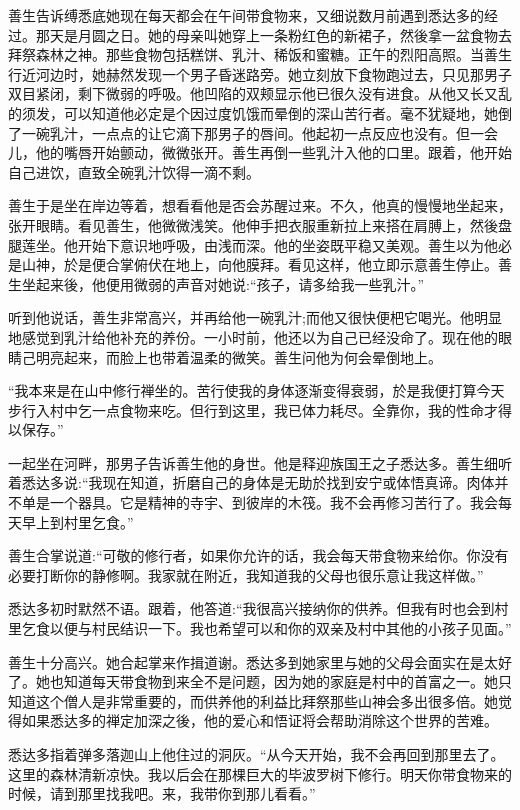 \documentclass[12pt,twoside,openany]{book}
\begin{document}
善生告诉缚悉底她现在每天都会在午间带食物来，又细说数月前遇到悉达多的经过。那天是月圆之日。她的母亲叫她穿上一条粉红色的新裙子，然後拿一盆食物去拜祭森林之神。那些食物包括糕饼、乳汁、稀饭和蜜糖。正午的烈阳高照。当善生行近河边时，她赫然发现一个男子昏迷路旁。她立刻放下食物跑过去，只见那男子双目紧闭，剩下微弱的呼吸。他凹陷的双颊显示他已很久没有进食。从他又长又乱的须发，可以知道他必定是个因过度饥饿而晕倒的深山苦行者。毫不犹疑地，她倒了一碗乳汁，一点点的让它滴下那男子的唇间。他起初一点反应也没有。但一会儿，他的嘴唇开始颤动，微微张开。善生再倒一些乳汁入他的口里。跟着，他开始自己进饮，直致全碗乳汁饮得一滴不剩。

善生于是坐在岸边等着，想看看他是否会苏醒过来。不久，他真的慢慢地坐起来，张开眼睛。看见善生，他微微浅笑。他伸手把衣服重新拉上来搭在肩膊上，然後盘腿莲坐。他开始下意识地呼吸，由浅而深。他的坐姿既平稳又美观。善生以为他必是山神，於是便合掌俯伏在地上，向他膜拜。看见这样，他立即示意善生停止。善生坐起来後，他便用微弱的声音对她说:“孩子，请多给我一些乳汁。”

听到他说话，善生非常高兴，并再给他一碗乳汁;而他又很快便杷它喝光。他明显地感觉到乳汁给他补充的养份。一小时前，他还以为自己已经没命了。现在他的眼睛己明亮起来，而脸上也带着温柔的微笑。善生问他为何会晕倒地上。

“我本来是在山中修行禅坐的。苦行使我的身体逐渐变得衰弱，於是我便打算今天步行入村中乞一点食物来吃。但行到这里，我已体力耗尽。全靠你，我的性命才得以保存。”

一起坐在河畔，那男子告诉善生他的身世。他是释迎族国王之子悉达多。善生细听着悉达多说:“我现在知道，折磨自己的身体是无助於找到安宁或体悟真谛。肉体并不单是一个器具。它是精神的寺宇、到彼岸的木筏。我不会再修习苦行了。我会每天早上到村里乞食。”

善生合掌说道:“可敬的修行者，如果你允许的话，我会每天带食物来给你。你没有必要打断你的静修啊。我家就在附近，我知道我的父母也很乐意让我这样做。”

悉达多初时默然不语。跟着，他答道:“我很高兴接纳你的供养。但我有时也会到村里乞食以便与村民结识一下。我也希望可以和你的双亲及村中其他的小孩子见面。”

善生十分高兴。她合起掌来作揖道谢。悉达多到她家里与她的父母会面实在是太好了。她也知道每天带食物到来全不是问题，因为她的家庭是村中的首富之一。她只知道这个僧人是非常重要的，而供养他的利益比拜祭那些山神会多出很多倍。她觉得如果悉达多的禅定加深之後，他的爱心和悟证将会帮助消除这个世界的苦难。

悉达多指着弹多落迦山上他住过的洞灰。“从今天开始，我不会再回到那里去了。这里的森林清新凉快。我以后会在那棵巨大的毕波罗树下修行。明天你带食物来的时候，请到那里找我吧。来，我带你到那儿看看。”
\end{document}
